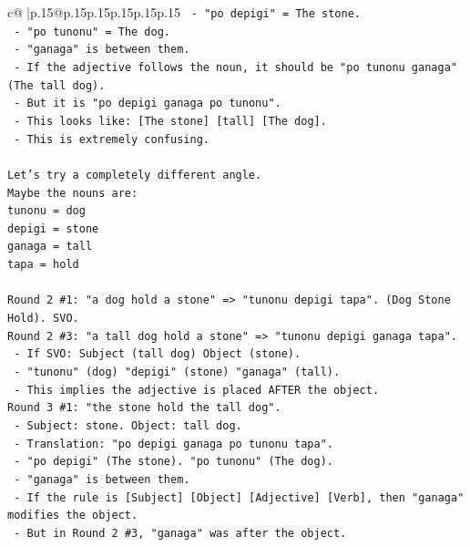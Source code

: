 \documentclass{article}
\begin{document}
{\begin{supertabular}{c@{$\;$}|p{.15\linewidth}@{}p{.15\linewidth}p{.15\linewidth}p{.15\linewidth}p{.15\linewidth}p{.15\linewidth}}
{{{\texttt{                      {-} "po depigi" = The stone.} \\
\texttt{                      {-} "po tunonu" = The dog.} \\
\texttt{                      {-} "ganaga" is between them.} \\
\texttt{                      {-} If the adjective follows the noun, it should be "po tunonu ganaga" (The tall dog).} \\
\texttt{                      {-} But it is "po depigi ganaga po tunonu".} \\
\texttt{                      {-} This looks like: {[}The stone{]} {[}tall{]} {[}The dog{]}.} \\
\texttt{                      {-} This is extremely confusing.} \\
\\ 
\texttt{Let's try a completely different angle.} \\
\texttt{Maybe the nouns are:} \\
\texttt{tunonu = dog} \\
\texttt{depigi = stone} \\
\texttt{ganaga = tall} \\
\texttt{tapa = hold} \\
\\ 
\texttt{Round 2 \#1: "a dog hold a stone" => "tunonu depigi tapa". (Dog Stone Hold). SVO.} \\
\texttt{Round 2 \#3: "a tall dog hold a stone" => "tunonu depigi ganaga tapa".} \\
\texttt{  {-} If SVO: Subject (tall dog) Object (stone).} \\
\texttt{  {-} "tunonu" (dog) "depigi" (stone) "ganaga" (tall).} \\
\texttt{  {-} This implies the adjective is placed AFTER the object.} \\
\texttt{Round 3 \#1: "the stone hold the tall dog".} \\
\texttt{  {-} Subject: stone. Object: tall dog.} \\
\texttt{  {-} Translation: "po depigi ganaga po tunonu tapa".} \\
\texttt{  {-} "po depigi" (The stone). "po tunonu" (The dog).} \\
\texttt{  {-} "ganaga" is between them.} \\
\texttt{  {-} If the rule is {[}Subject{]} {[}Object{]} {[}Adjective{]} {[}Verb{]}, then "ganaga" modifies the object.} \\
\texttt{  {-} But in Round 2 \#3, "ganaga" was after the object.} \\
}}}
\end{supertabular}}
\end{document}
